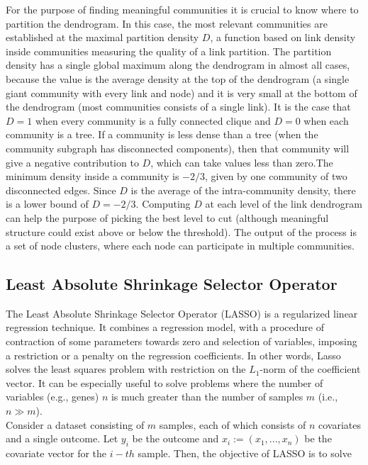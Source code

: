 \documentclass[12pt,journal, onecolumn]{IEEEtran}
\begin{document}
For the purpose of finding meaningful communities it is crucial to know where to partition the dendrogram. In this case, the most relevant communities are established at the maximal partition density $D$, a function  based on link density inside communities measuring the quality of a link partition. The partition density has a single global maximum along the dendrogram in almost all cases, because the value is the average density at the top of the dendrogram (a single giant community with every link and node) and it is very small at the bottom of the dendrogram (most communities consists of a single link). It is the case that $D = 1$ when every community is a fully connected clique and $D = 0$ when each community is a tree. If a community is less dense than a tree (when the community subgraph has  disconnected components), then that community will give a negative contribution to $D $, which can take values less than zero.The minimum density inside a community is $-2/3$,  given by one community of two disconnected edges. Since $D$ is the average of the intra-community density, there is a lower bound of $D=-2/3$. Computing $D$ at each level of the link dendrogram can help the purpose of picking the best level to cut (although meaningful structure could exist above or below the threshold). The output of the process is a set of node clusters, where each node can participate in multiple communities.\\

\subsection{Least Absolute Shrinkage Selector Operator}
The Least Absolute Shrinkage Selector Operator (LASSO) is a regularized linear regression technique. It combines a regression model, with a procedure of contraction of some parameters towards zero and selection of variables, imposing a restriction or a penalty on the regression coefficients. In other words, Lasso solves the least squares problem with restriction on the $ L_1$-norm of the coefficient vector. It can be especially useful to solve problems where the number of variables (e.g., genes) $ n $ is much greater than the number of samples $ m $ (i.e., $ n \gg m $).\\

Consider a dataset consisting of $m$ samples, each of which consists of $n$ covariates and a single outcome. Let $y_i$ be the outcome and $x_i := (x_1,...,x_n)$ be the covariate vector for the $i-th$ sample. Then, the objective of LASSO is to solve
\end{document}
